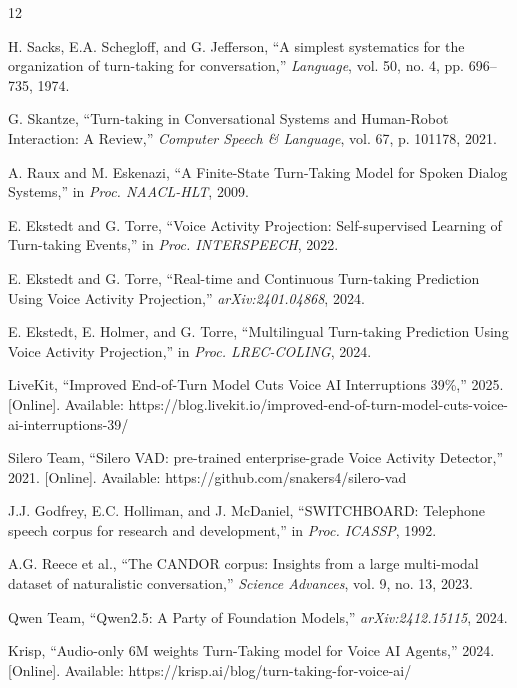 \documentclass[conference]{IEEEtran}
\begin{document}

\begin{thebibliography}{12}

H. Sacks, E.A. Schegloff, and G. Jefferson,
``A simplest systematics for the organization of turn-taking for conversation,''
\textit{Language}, vol. 50, no. 4, pp. 696--735, 1974.

G. Skantze,
``Turn-taking in Conversational Systems and Human-Robot Interaction: A Review,''
\textit{Computer Speech \& Language}, vol. 67, p. 101178, 2021.

A. Raux and M. Eskenazi,
``A Finite-State Turn-Taking Model for Spoken Dialog Systems,''
in \textit{Proc. NAACL-HLT}, 2009.

E. Ekstedt and G. Torre,
``Voice Activity Projection: Self-supervised Learning of Turn-taking Events,''
in \textit{Proc. INTERSPEECH}, 2022.

E. Ekstedt and G. Torre,
``Real-time and Continuous Turn-taking Prediction Using Voice Activity Projection,''
\textit{arXiv:2401.04868}, 2024.

E. Ekstedt, E. Holmer, and G. Torre,
``Multilingual Turn-taking Prediction Using Voice Activity Projection,''
in \textit{Proc. LREC-COLING}, 2024.

LiveKit,
``Improved End-of-Turn Model Cuts Voice AI Interruptions 39\%,''
2025. [Online]. Available: https://blog.livekit.io/improved-end-of-turn-model-cuts-voice-ai-interruptions-39/

Silero Team,
``Silero VAD: pre-trained enterprise-grade Voice Activity Detector,''
2021. [Online]. Available: https://github.com/snakers4/silero-vad

J.J. Godfrey, E.C. Holliman, and J. McDaniel,
``SWITCHBOARD: Telephone speech corpus for research and development,''
in \textit{Proc. ICASSP}, 1992.

A.G. Reece et al.,
``The CANDOR corpus: Insights from a large multi-modal dataset of naturalistic conversation,''
\textit{Science Advances}, vol. 9, no. 13, 2023.

Qwen Team,
``Qwen2.5: A Party of Foundation Models,''
\textit{arXiv:2412.15115}, 2024.

Krisp,
``Audio-only 6M weights Turn-Taking model for Voice AI Agents,''
2024. [Online]. Available: https://krisp.ai/blog/turn-taking-for-voice-ai/

\end{thebibliography}
\end{document}
